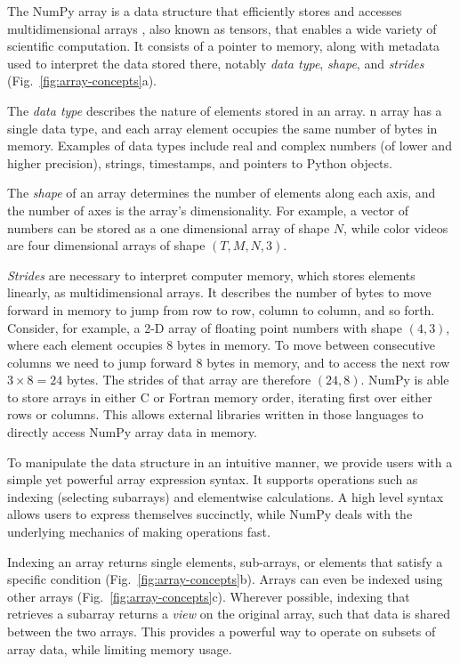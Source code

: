 The NumPy array is a data structure that efficiently stores and accesses
multidimensional arrays \cite{vanderwalt2011numpy}, also known as tensors, that
enables a wide variety of scientific computation.
It consists of a pointer to memory, along with metadata used to interpret the
data stored there, notably {\em data type}, {\em shape}, and {\em strides}
(Fig.~\ref{fig:array-concepts}a).

The {\em data type} describes the nature of elements stored in an array.
n array has a single data type, and each array element occupies the same
number of bytes in memory.
Examples of data types include real and complex numbers (of lower and higher
precision), strings, timestamps, and pointers to Python objects.

The {\em shape} of an array determines the number of elements along each axis,
and the number of axes is the array's dimensionality.
For example, a vector of numbers can be stored as a one dimensional array of
shape $N$, while color videos are four dimensional arrays of shape
$(T, M, N, 3)$.

{\em Strides} are necessary to interpret computer memory, which stores elements
linearly, as multidimensional arrays.
It describes the number of bytes to move forward in memory to jump from row to
row, column to column, and so forth.
Consider, for example, a 2-D array of floating point numbers with shape
$(4, 3)$, where each element occupies 8 bytes in memory.
To move between consecutive columns we need to jump forward 8 bytes in memory,
and to access the next row $3 \times 8 = 24$ bytes.
The strides of that array are therefore $(24, 8)$.  NumPy is able to
store arrays in either C or Fortran memory order, iterating
first over either rows or columns.  This allows external libraries
written in those languages to directly access NumPy array data in memory.

To manipulate the data structure in an intuitive manner, we provide users with
a simple yet powerful array expression syntax.
It supports operations such as indexing (selecting subarrays) and elementwise
calculations.
A high level syntax allows users to express themselves succinctly, while NumPy
deals with the underlying mechanics of making operations fast.

Indexing an array returns single elements, sub-arrays, or elements that satisfy
a specific condition (Fig.~\ref{fig:array-concepts}b).
Arrays can even be indexed using other arrays (Fig.~\ref{fig:array-concepts}c).
Wherever possible, indexing that retrieves a subarray returns a {\em view} on
the original array, such that data is shared between the two arrays.
This provides a powerful way to operate on subsets of array data, while
limiting memory usage.

